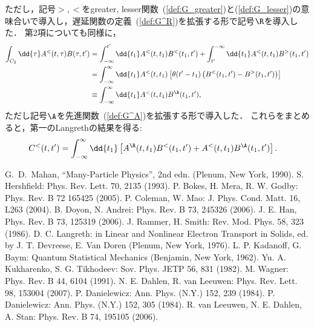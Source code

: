 \documentclass[a4paper,10pt]{jsarticle}
\begin{document}
ただし，記号$>, <$をgreater, lesser関数~(\ref{def:G_greater})と(\ref{def:G_lesser})の意味合いで導入し，遅延関数の定義~(\ref{def:G^R})を拡張する形で記号$\R$を導入した．
第2項についても同様に，
\begin{align*}
\int_{C_2} \dd{\tau} A^{<} (t, \tau) B (\tau, t')
	& = \int_{-\infty}^{t'} \dd{t_1} A^{<} (t, t_1) B^{<} (t_1, t')
		+ \int_{t'}^{-\infty} \dd{t_1} A^{<} (t, t_1) B^{>} (t_1, t')
\\	& = \int_{-\infty}^{\infty} \dd{t_1} A^{<} (t, t_1) \left[ \theta (t' - t_1) \left( B^{<} (t_1, t') - B^{>} (t_1, t') \right) \right]
\\	& \equiv \int_{-\infty}^{\infty} \dd{t_1} A^{<} (t, t_1) B^{\A} (t_1, t')
,\end{align*}
ただし記号$\A$を先進関数~(\ref{def:G^A})を拡張する形で導入した．
これらをまとめると，第一のLangrethの結果を得る:
\begin{align}
C^{<} (t, t')
	& = \int_{-\infty}^{\infty} \dd{t_1} \left[ A^{\R} (t, t_1) B^{<} (t_1, t') + A^{<} (t, t_1) B^{\A} (t_1, t') \right]
.\end{align}












%

\begin{thebibliography}{99}
 G.~D.~Mahan, ``Many-Particle Physics'', 2nd edn. (Plenum, New York, 1990).
 S. Hershfield: Phys. Rev. Lett. 70, 2135 (1993).
 P. Bokes, H. Mera, R. W. Godby: Phys. Rev. B 72 165425 (2005).
 P. Coleman, W. Mao: J. Phys. Cond. Matt. 16, L263 (2004).
 B. Doyon, N. Andrei: Phys. Rev. B 73, 245326 (2006).
 J. E. Han, Phys. Rev. B 73, 125319 (2006).
 J. Rammer, H. Smith: Rev. Mod. Phys. 58, 323 (1986).
 D. C. Langreth: in Linear and Nonlinear Electron Transport in Solids, ed. by J. T. Devreese, E. Van Doren (Plenum, New York, 1976).
 L. P. Kadanoff, G. Baym: Quantum Statistical Mechanics (Benjamin, New York, 1962).
 Yu. A. Kukharenko, S. G. Tikhodeev: Sov. Phys. JETP 56, 831 (1982).
 M. Wagner: Phys. Rev. B 44, 6104 (1991).
 N. E. Dahlen, R. van Leeuwen: Phys. Rev. Lett. 98, 153004 (2007).
 P. Danielewicz: Ann. Phys. (N.Y.) 152, 239 (1984).
 P. Danielewicz: Ann. Phys. (N.Y.) 152, 305 (1984).
 R. van Leeuwen, N. E. Dahlen, A. Stan: Phys. Rev. B 74, 195105 (2006).

\end{thebibliography}
\end{document}

